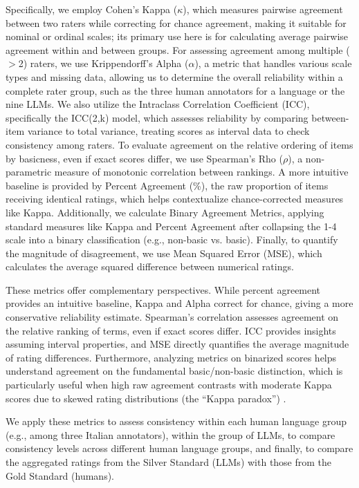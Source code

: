\documentclass[preprint,12pt,authoryear]{elsarticle}
\begin{document}
Specifically, we employ Cohen's Kappa ($\kappa$), which measures pairwise agreement between two raters while correcting for chance agreement, making it suitable for nominal or ordinal scales; its primary use here is for calculating average pairwise agreement within and between groups. For assessing agreement among multiple ($>$2) raters, we use Krippendorff's Alpha ($\alpha$), a metric that handles various scale types and missing data, allowing us to determine the overall reliability within a complete rater group, such as the three human annotators for a language or the nine LLMs. We also utilize the Intraclass Correlation Coefficient (ICC), specifically the ICC(2,k) model, which assesses reliability by comparing between-item variance to total variance, treating scores as interval data to check consistency among raters. To evaluate agreement on the relative ordering of items by basicness, even if exact scores differ, we use Spearman's Rho ($\rho$), a non-parametric measure of monotonic correlation between rankings. A more intuitive baseline is provided by Percent Agreement (\%), the raw proportion of items receiving identical ratings, which helps contextualize chance-corrected measures like Kappa. Additionally, we calculate Binary Agreement Metrics, applying standard measures like Kappa and Percent Agreement after collapsing the 1-4 scale into a binary classification (e.g., non-basic vs. basic). Finally, to quantify the magnitude of disagreement, we use Mean Squared Error (MSE), which calculates the average squared difference between numerical ratings.

These metrics offer complementary perspectives. While percent agreement provides an intuitive baseline, Kappa and Alpha correct for chance, giving a more conservative reliability estimate. Spearman's correlation assesses agreement on the relative ranking of terms, even if exact scores differ. ICC provides insights assuming interval properties, and MSE directly quantifies the average magnitude of rating differences. Furthermore, analyzing metrics on binarized scores helps understand agreement on the fundamental basic/non-basic distinction, which is particularly useful when high raw agreement contrasts with moderate Kappa scores due to skewed rating distributions (the ``Kappa paradox'') \cite{feinstein_high_1990,cicchetti_high_1990}.

We apply these metrics to assess consistency within each human language group (e.g., among three Italian annotators), within the group of LLMs, to compare consistency levels across different human language groups, and finally, to compare the aggregated ratings from the Silver Standard (LLMs) with those from the Gold Standard (humans).
\end{document}
